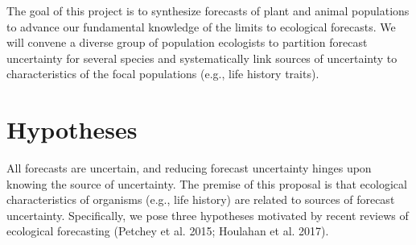 \documentclass[12pt,]{article}
\begin{document}
The goal of this project is to synthesize forecasts of plant and animal
populations to advance our fundamental knowledge of the limits to
ecological forecasts. We will convene a diverse group of population
ecologists to partition forecast uncertainty for several species and
systematically link sources of uncertainty to characteristics of the
focal populations (e.g., life history traits).

\section{Hypotheses}

All forecasts are uncertain, and reducing forecast uncertainty hinges
upon knowing the source of uncertainty. The premise of this proposal is
that ecological characteristics of organisms (e.g., life history) are
related to sources of forecast uncertainty. Specifically, we pose three
hypotheses motivated by recent reviews of ecological forecasting
(Petchey et al. 2015; Houlahan et al. 2017).
\end{document}
